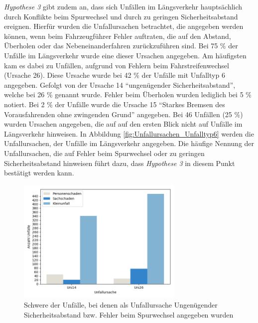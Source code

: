 \textit{Hypothese 3} gibt zudem an, dass sich Unfällen im Längsverkehr hauptsächlich durch Konflikte beim Spurwechsel und durch zu geringen Sicherheitsabstand ereignen. Hierfür wurden die Unfallursachen betrachtet, die angegeben werden können, wenn beim Fahrzeugführer Fehler auftraten, die auf den Abstand, Überholen oder das Nebeneinanderfahren zurückzuführen sind. Bei 75 \% der Unfälle im Längsverkehr wurde eine dieser Ursachen angegeben. Am häufigsten kam es dabei zu Unfällen, aufgrund von Fehlern beim Fahrstreifenwechsel (Ursache 26). Diese Ursache wurde bei 42 \% der Unfälle mit Unfalltyp 6 angegeben. Gefolgt von der Ursache 14 \enquote{ungenügender Sicherheitsabstand}, welche bei 26 \% genannt wurde. Fehler beim Überholen wurden lediglich bei 5 \% notiert. Bei 2 \% der Unfälle wurde die Ursache 15 \enquote{Starkes Bremsen des Vorausfahrenden ohne zwingenden Grund} angegeben. Bei 46 Unfällen (25 \%) wurden Ursachen angegeben, die auf auf den ersten Blick nicht auf Unfälle im Längsverkehr hinweisen. In Abbildung \ref{fig:Unfallursachen_Unfalltyp6} werden die Unfallursachen, der Unfälle im Längsverkehr angegeben. Die häufige Nennung der Unfallursachen, die auf Fehler beim Spurwechsel oder zu geringen Sicherheitsabstand hinweisen führt dazu, dass \textit{Hypothese 3} in diesem Punkt bestätigt werden kann.

\begin{savenotes}
	\begin{figure}[H]
		\centering
		\includegraphics[width=8cm,height=6cm]{figures/Urs14_Urs26_Md}
		\caption[Schwere der Unfälle, bei denen als Unfallursache Ungenügender Sicherheitsabstand bzw. Fehler beim Spurwechsel angegeben wurden]{Schwere der Unfälle, bei denen als Unfallursache Ungenügender Sicherheitsabstand bzw. Fehler beim Spurwechsel angegeben wurden}\label{fig:Unfallursachen_14_26}
	\end{figure}
\end{savenotes}

